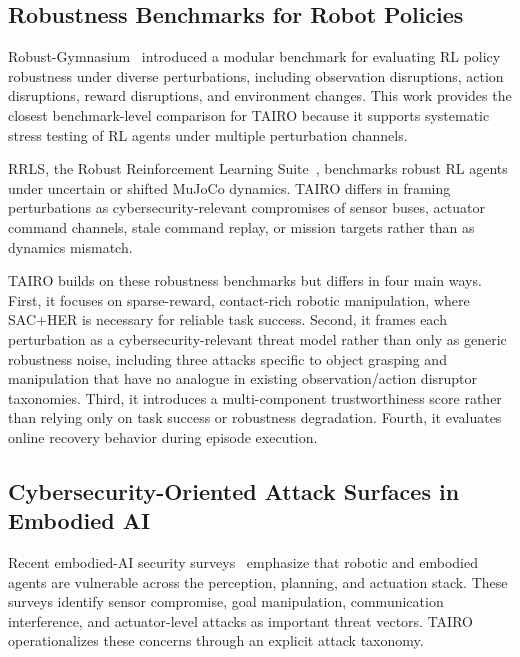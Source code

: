 \documentclass[conference]{IEEEtran}
\begin{document}
\subsection{Robustness Benchmarks for Robot Policies}

Robust-Gymnasium~\cite{gu2025robustgymnasium} introduced a modular benchmark for
evaluating RL policy robustness under diverse perturbations, including observation
disruptions, action disruptions, reward disruptions, and environment changes. This work
provides the closest benchmark-level comparison for TAIRO because it supports systematic
stress testing of RL agents under multiple perturbation channels.

RRLS, the Robust Reinforcement Learning Suite~\cite{zouitine2024rrls}, benchmarks robust
RL agents under uncertain or shifted MuJoCo dynamics. TAIRO differs in framing
perturbations as cybersecurity-relevant compromises of sensor buses, actuator command
channels, stale command replay, or mission targets rather than as dynamics mismatch.

TAIRO builds on these robustness benchmarks but differs in four main ways. First, it
focuses on sparse-reward, contact-rich robotic manipulation, where SAC+HER is necessary
for reliable task success. Second, it frames each perturbation as a cybersecurity-relevant
threat model rather than only as generic robustness noise, including three attacks
specific to object grasping and manipulation that have no analogue in existing
observation/action disruptor taxonomies. Third, it introduces a multi-component
trustworthiness score rather than relying only on task success or robustness
degradation. Fourth, it evaluates online recovery behavior during episode execution.

\subsection{Cybersecurity-Oriented Attack Surfaces in Embodied AI}

Recent embodied-AI security surveys~\cite{xing2025robustembodied} emphasize that
robotic and embodied agents are vulnerable across the perception, planning, and
actuation stack. These surveys identify sensor compromise, goal manipulation,
communication interference, and actuator-level attacks as important threat vectors.
TAIRO operationalizes these concerns through an explicit attack taxonomy.
\end{document}
